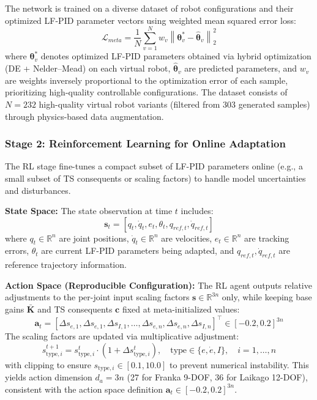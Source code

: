 \documentclass[DTMColor]{ROB-New}
\begin{document}
The network is trained on a diverse dataset of robot configurations and their optimized LF-PID parameter vectors using weighted mean squared error loss:
\begin{equation}
    \mathcal{L}_{meta} = \frac{1}{N}\sum_{v=1}^{N} w_v \left\|\bm{\theta}_v^* - \hat{\bm{\theta}}_v\right\|_2^2
\end{equation}
where $\bm{\theta}_v^*$ denotes optimized LF-PID parameters obtained via hybrid optimization (DE + Nelder--Mead) on each virtual robot, $\hat{\bm{\theta}}_v$ are predicted parameters, and $w_v$ are weights inversely proportional to the optimization error of each sample, prioritizing high-quality controllable configurations. The dataset consists of $N=232$ high-quality virtual robot variants (filtered from 303 generated samples) through physics-based data augmentation.

\subsubsection{Stage 2: Reinforcement Learning for Online Adaptation}

The RL stage fine-tunes a compact subset of LF-PID parameters online (e.g., a small subset of TS consequents or scaling factors) to handle model uncertainties and disturbances.

\textbf{State Space:} The state observation at time $t$ includes:
\begin{equation}
    \mathbf{s}_t = [q_t, \dot{q}_t, e_t, \theta_t, q_{ref,t}, \dot{q}_{ref,t}]
\end{equation}
where $q_t \in \mathbb{R}^n$ are joint positions, $\dot{q}_t \in \mathbb{R}^n$ are velocities, $e_t \in \mathbb{R}^n$ are tracking errors, $\theta_t$ are current LF-PID parameters being adapted, and $q_{ref,t}, \dot{q}_{ref,t}$ are reference trajectory information.

                        \textbf{Action Space (Reproducible Configuration):} The RL agent outputs relative adjustments to the per-joint input scaling factors $\bm{s} \in \mathbb{R}^{3n}$ only, while keeping base gains $\bar{\bm{K}}$ and TS consequents $\bm{c}$ fixed at meta-initialized values:
\begin{equation}
    \mathbf{a}_t = [\Delta s_{e,1}, \Delta s_{\dot e,1}, \Delta s_{I,1}, \ldots, \Delta s_{e,n}, \Delta s_{\dot e,n}, \Delta s_{I,n}]^\top \in [-0.2, 0.2]^{3n}
\end{equation}
The scaling factors are updated via multiplicative adjustment:
\begin{equation}
    s_{\text{type},i}^{t+1} = s_{\text{type},i}^{t} \cdot (1 + \Delta s_{\text{type},i}^t), \quad \text{type} \in \{e, \dot e, I\}, \quad i=1,\ldots,n
\end{equation}
with clipping to ensure $s_{\text{type},i} \in [0.1, 10.0]$ to prevent numerical instability. This yields action dimension $d_a = 3n$ (27 for Franka 9-DOF, 36 for Laikago 12-DOF), consistent with the action space definition $\mathbf{a}_t \in [-0.2, 0.2]^{3n}$.
\end{document}
